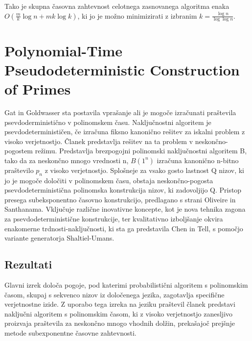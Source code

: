 \documentclass{article}
\begin{document}
Tako je skupna časovna zahtevnost celotnega zasnovanega algoritma enaka $O(\frac{m}{k}\log n + mk \log k)$, ki jo je možno minimizirati z izbranim $k = \frac{\log n}{\log \log n}$.
\section{Polynomial-Time Pseudodeterministic Construction of Primes}
Gat in Goldwasser sta postavila vprašanje ali je mogoče izračunati praštevila psevdoderministično v polinomskem času. Naključnostni algoritem je psevdodeterminističen, če izračuna fiksno kanonično rešitev za iskalni problem z visoko verjetnostjo. Članek predstavlja rešitev na ta problem v neskončno-pogostem režimu. Predstavlja brezpogojni polinomski naključnostni algoritem B, tako da za neskončno mnogo vrednosti n, $B(1^n)$ izračuna kanonično n-bitno praštevilo $p_n$ z visoko verjetnostjo. Splošneje za vsako gosto lastnost Q nizov, ki jo je mogoče določiti v polinomskem času, obstaja neskončno-pogosta psevdodeterministična polinomska konstrukcija nizov, ki zadovoljijo Q. Pristop presega subeksponentno časovno konstrukcijo, predlagano s strani Oliveire in Santhanama. Vključuje različne inovativne koncepte, kot je nova tehnika zagona za psevdodeterministične konstrukcije, ter kvalitativno izboljšanje okvira enakomerne trdnosti-naključnosti, ki sta ga predstavila Chen in Tell, s pomočjo variante generatorja Shaltiel-Umans.

\subsection{Rezultati}
Glavni izrek določa pogoje, pod katerimi probabilistični algoritem s polinomskim časom, skupaj s sekvenco nizov iz določenega jezika, zagotavlja specifične verjetnostne izide. Z uporabo tega izreka na jeziku praštevil članek predstavi naključni algoritem s polinomskim časom, ki z visoko verjetnostjo zanesljivo proizvaja praštevila za neskončno mnogo vhodnih dolžin, prekašajoč prejšnje metode subexponentne časovne zahtevnosti.
\end{document}
